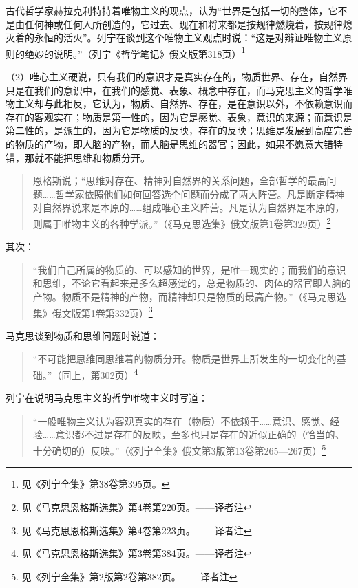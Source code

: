 古代哲学家赫拉克利特持着唯物主义的现点，认为“世界是包括一切的整体，它不是由任何神或任何人所创造的，它过去、现在和将来都是按规律燃烧着，按规律熄灭着的永恒的活火”。列宁在谈到这个唯物主义观点时说：“这是对辩证唯物主义原则的绝妙的说明。”（列宁《哲学笔记》俄文版第318页）\footnote{见《列宁全集》第38卷第395页。}

（2）唯心主义硬说，只有我们的意识才是真实存在的，物质世界、存在，自然界只是在我们的意识中，在我们的感觉、表象、概念中存在，而马克思主义的哲学唯物主义却与此相反，它认为，物质、自然界、存在，是在意识以外，不依赖意识而存在的客观实在；物质是第一性的，因为它是感觉、表象，意识的来源；而意识是第二性的，是派生的，因为它是物质的反映，存在的反映；思维是发展到高度完善的物质的产物，即人脑的产物，而人脑是思维的器官；因此，如果不愿意大错特错，那就不能把思维和物质分开。

\begin{quotation}
恩格斯说；“思维对存在、精神对自然界的关系问题，全部哲学的最高问题……哲学家依照他们如何回答选个问题而分成了两大阵营。凡是断定精神对自然界说来是本原的……组成唯心主义阵营。凡是认为自然界是本原的，则属于唯物主义的各种学派。”（《马克思选集》俄文版第1卷第329页）\footnote{见《马克思恩格斯选集》第4卷第220页。——译者注}
\end{quotation}

其次：

\begin{quotation}
“我们自己所属的物质的、可以感知的世界，是唯一现实的；而我们的意识和思维，不论它看起来是多么超感觉的，总是物质的、肉体的器官即人脑的产物。物质不是精神的产物，而精神却只是物质的最高产物。”（《马克思选集》俄文版第1卷第332页）\footnote{见《马克思恩格斯选集》第4卷第223页。——译者注}
\end{quotation}

马克思谈到物质和思维问题时说道：

\begin{quotation}
“不可能把思维同思维着的物质分开。物质是世界上所发生的一切变化的基础。”（同上，第302页）\footnote{见《马克思恩格斯选集》第3卷第384页。——译者注}
\end{quotation}

列宁在说明马克思主义的哲学唯物主义时写道：

\begin{quotation}
“一般唯物主义认为客观真实的存在（物质）不依赖于……意识、感觉、经验……意识都不过是存在的反映，至多也只是存在的近似正确的（恰当的、十分确切的）反映。”（《列宁全集》俄文第3版第13卷第265—267页）\footnote{见《列宁全集》第2版第2卷第382页。——译者注}
\end{quotation}

